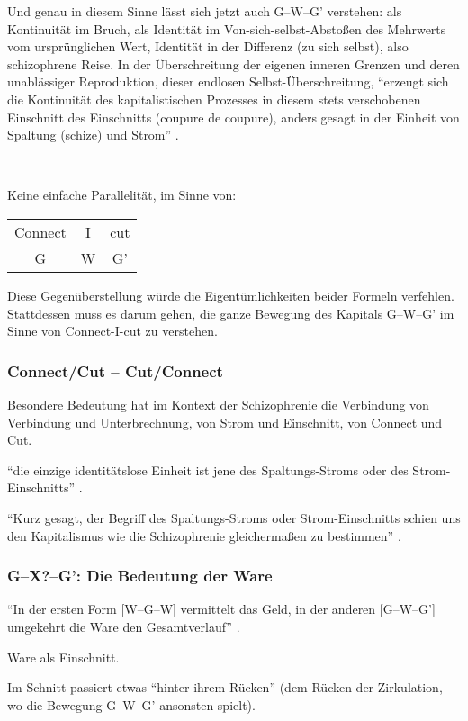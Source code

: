 \documentclass[12pt,
               DIV13,
               paper=a4,
               twoside=false,
               onehalfspacing,
               bibliography=totoc,
               toc=graduated,
               draft,
               ]{scrartcl}
\newcommand{\pc}[2]{\parencite[#1]{#2}}
\newcommand{\gwg}{G--W--G'\xspace}
\newcommand{\wgw}{W--G--W\xspace}
\newcommand{\cic}{Connect-I-cut\xspace}
\begin{document}
Und genau in diesem Sinne lässt sich jetzt auch \gwg verstehen: als
Kontinuität im Bruch, als Identität im Von-sich-selbst-Abstoßen des
Mehrwerts vom ursprünglichen Wert, Identität in der Differenz (zu sich
selbst), also schizophrene Reise. In der Überschreitung der eigenen
inneren Grenzen und deren unablässiger Reproduktion, dieser endlosen
Selbst-Ü\-ber\-schrei\-tung, "`erzeugt sich die Kontinuität des
kapitalistischen Prozesses in diesem stets verschobenen Einschnitt des
Einschnitts (coupure de coupure), anders gesagt in der Einheit von
Spaltung (schize) und Strom"' \pc{296}{ao}.

--

Keine einfache Parallelität, im Sinne von:
%
\begin{tabular}{c@{ - }c@{ - }c}
Connect & I & cut\\
G & W & G'
\end{tabular}

Diese Gegenüberstellung würde die Eigentümlichkeiten beider Formeln
verfehlen. Stattdessen muss es darum gehen, die ganze Bewegung des
Kapitals \gwg im Sinne von \cic zu verstehen.

\subsubsection{Connect/Cut -- Cut/Connect}

Besondere Bedeutung hat im Kontext der Schizophrenie die Verbindung
von Verbindung und Unterbrechnung, von Strom und Einschnitt, von
Connect und Cut.

"`die einzige identitätslose Einheit ist jene des Spaltungs-Stroms
oder des Strom-Einschnitts"' \pc{314}{ao}.

"`Kurz gesagt, der Begriff des Spaltungs-Stroms oder Strom-Einschnitts
schien uns den Kapitalismus wie die Schizophrenie gleichermaßen zu
bestimmen"' \pc{317}{ao}.

\subsubsection{G--X?--G': Die Bedeutung der Ware}

"`In der ersten Form [\wgw] vermittelt das Geld, in der anderen [\gwg]
umgekehrt die Ware den Gesamtverlauf"' \pc{163}{kap}.

Ware als Einschnitt.

Im Schnitt passiert etwas "`hinter ihrem Rücken"' \pc{181}{kap} (dem
Rücken der Zirkulation, wo die Bewegung \gwg ansonsten spielt).
\end{document}
